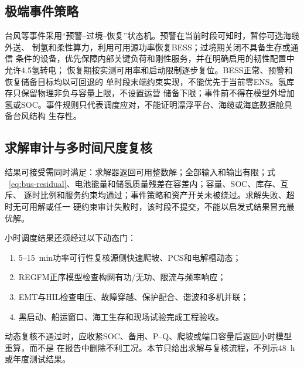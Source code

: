 \subsection{极端事件策略}

台风等事件采用“预警--过境--恢复”状态机。预警在当前时段可知时，暂停可选海缆外送、
制氢和柔性算力，利用可用源功率恢复BESS；过境期关闭不具备生存或通信
条件的设备，优先保障内部关键负荷和刚性服务，并在明确启用的韧性配置中允许4.5氢转电；
恢复期按实测可用率和启动限制逐步复位。BESS正常、预警和恢复储备目标均以可回退的
单时段末端约束实现，不能优先于当前零ENS。氢库存只保留物理非负与容量上限，不设置运营
储备下限；事件前不得在模型外增加氢或SOC。事件规则只代表调度应对，不能证明漂浮平台、海缆或海底数据舱具备台风结构
生存性。

\subsection{求解审计与多时间尺度复核}

结果可接受需同时满足：求解器返回可用整数解；全部输入和输出有限；式
~\eqref{eq:bus-residual}、电池能量和储氢质量残差在容差内；容量、SOC、库存、互斥、
逐时比例和服务约束均通过；事件策略和资产开关未被绕过。求解失败、超时无可用解或任一
硬约束审计失败时，该时段不提交，不能以启发式结果冒充最优解。

小时调度结果还须经过以下动态门：
\begin{enumerate}[label=(\arabic*)]
\item 5--15~min功率可行性复核源侧快速爬坡、PCS和电解槽动态；
\item REGFM正序模型检查构网有功/无功、限流与频率响应\cite{regfm-b1}；
\item EMT与HIL检查电压、故障穿越、保护配合、谐波和多机并联；
\item 黑启动、船运窗口、海工生存和现场试验完成工程验收。
\end{enumerate}
动态复核不通过时，应收紧SOC、备用、P--Q、爬坡或端口容量后返回小时模型重算，而不是
在报告中删除不利工况。本节只给出求解与复核流程，不列示48~h或年度测试结果。
